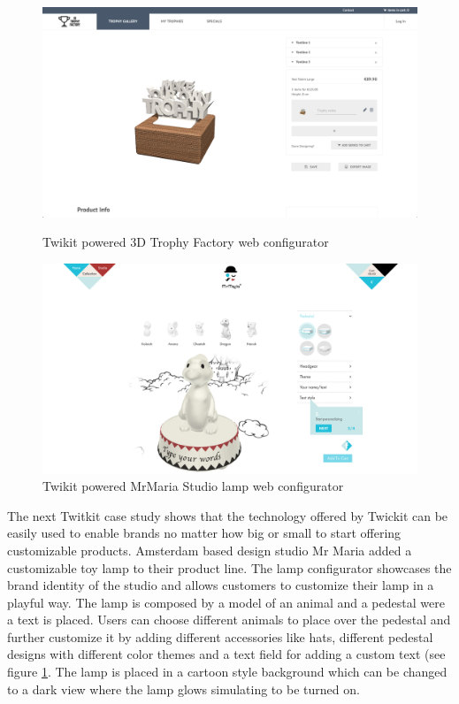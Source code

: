 \documentclass[../medieninformatik-arbeit.tex]{subfiles}
\begin{document}
\begin{figure}[h]
\captionsetup{width=0.4\textwidth}
\centering
\begin{minipage}{.45\textwidth}
\centering
  \includegraphics[width=\linewidth]{RelatedWork/img/trophy-config}
  \caption{\protect Twikit powered 3D Trophy Factory web configurator\cite{trophy2015factory}}
\label{fig:trophy-config}
\end{minipage}
\begin{minipage}{.45\textwidth}
\centering
  \includegraphics[width=\linewidth]{RelatedWork/img/mrmaria-config}
  \caption{\protect Twikit powered MrMaria Studio lamp web configurator\cite{mrmaria2015studio}} 
\label{fig:mmaria-config}
\end{minipage}
\end{figure}

The next Twitkit case study shows that the technology offered by Twickit can be easily used to enable brands no matter how big or small to start offering customizable products. Amsterdam based design studio Mr Maria\cite{mrmaria2015studio} added a customizable toy lamp to their product line. The lamp configurator showcases the brand identity of the studio and allows customers to customize their lamp in a playful way. The lamp is composed by a model of an animal and a pedestal were a text is placed. Users can choose different animals to place over the pedestal and further customize it by adding different accessories like hats, different pedestal designs with different color themes and a text field for adding a custom text (see figure \ref{fig:mmaria-config}. The lamp is placed in a cartoon style background which can be changed to a dark view where the lamp glows simulating to be turned on.  
\end{document}
